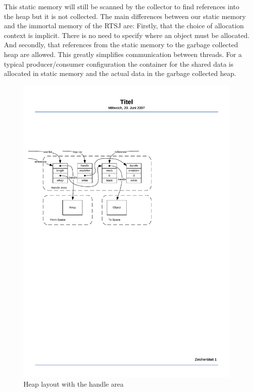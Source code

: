 This static memory will still be scanned by the collector to find
references into the heap but it is not collected. The main
differences between our static memory and the immortal memory of the
RTSJ are: Firstly, that the choice of allocation context is
implicit. There is no need to specify where an object must be
allocated. And secondly, that references from the static memory to
the garbage collected heap are allowed.  This greatly simplifies
communication between threads.  For a typical producer/consumer
configuration the container for the shared data is allocated in
static memory and the actual data in the garbage collected heap.


\begin{figure}  \centering
  \includegraphics{jvm/handles}
  \caption{Heap layout with the handle area}\label{fig:handles}
\end{figure}


